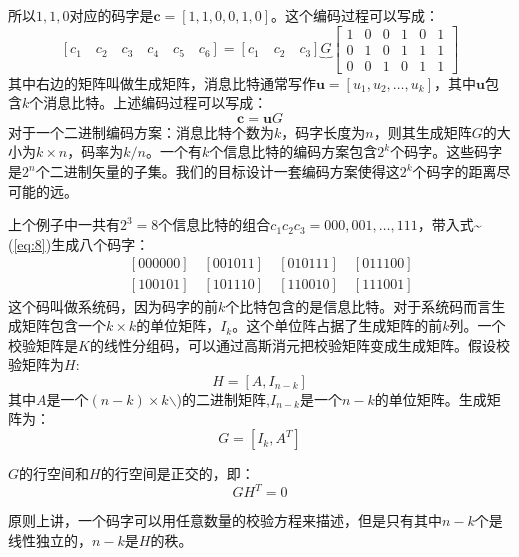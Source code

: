 \documentclass[10pt,a4paper,UTF8]{article}
\begin{document}
所以\(1,1,0\)对应的码字是\(\mathbf{c}=[1,1,0,0,1,0]\)。这个编码过程可以写成：
\begin{equation}
\label{eq:8}
[c_{1}\quad c_{2}\quad c_{3} \quad c_{4} \quad c_{5} \quad c_{6}] =[c_{1} \quad c_{2} \quad c_{3}]
\underbrace{G}{
\begin{bmatrix}
1 & 0 & 0 & 1 & 0 & 1\\
0 & 1 & 0 & 1 & 1 & 1\\
0 & 0 & 1 & 0 & 1 & 1
\end{bmatrix}}
\end{equation}
其中右边的矩阵叫做生成矩阵，消息比特通常写作\(\mathbf{u} = [u_{1},u_{2},\ldots ,u_{k}]\)，其中\(\mathbf{u}\)包含\(k\)个消息比特。上述编码过程可以写成：
\begin{equation}
\label{eq:9}
\mathbf{c} = \mathbf{u}G
\end{equation}
对于一个二进制编码方案：消息比特个数为\(k\)，码字长度为\(n\)，则其生成矩阵\(G\)的大小为\(k\times n\)，码率为\(k/n\)。一个有\(k\)个信息比特的编码方案包含\(2^{k}\)个码字。这些码字是\(2^{n}\)个二进制矢量的子集。我们的目标设计一套编码方案使得这\(2^{k}\)个码字的距离尽可能的远。

上个例子中一共有\(2^{3}=8\)个信息比特的组合\(c_{1}c_{2}c_{3}= 000,001,\ldots ,111\)，带入式\textasciitilde{}(\ref{eq:8})生成八个码字：
\begin{eqnarray*}
&&[000000] \quad [001011]\quad [010111]\quad [011100]\\
&&[100101]\quad [101110]\quad [110010]\quad [111001]
\end{eqnarray*}
这个码叫做系统码，因为码字的前\(k\)个比特包含的是信息比特。对于系统码而言生成矩阵包含一个\(k\times k\)的单位矩阵，\(I_{k}\)。这个单位阵占据了生成矩阵的前\(k\)列。一个校验矩阵是\(K\)的线性分组码，可以通过高斯消元把校验矩阵变成生成矩阵。假设校验矩阵为\(H\):
\begin{equation}
\label{eq:10}
H = [A,I_{n-k}]
\end{equation}
其中\(A\)是一个\((n-k)\times k\)$\backslash$)的二进制矩阵,\(I_{n-k}\)是一个\(n-k\)的单位矩阵。生成矩阵为：
\begin{equation}
\label{eq:11}
G =[I_{k},A^{T}]
\end{equation}

\(G\)的行空间和\(H\)的行空间是正交的，即：
\begin{equation}
\label{eq:12}
GH^{T} = 0
\end{equation}

原则上讲，一个码字可以用任意数量的校验方程来描述，但是只有其中\(n-k\)个是线性独立的，\(n-k\)是\(H\)的秩。
\end{document}
